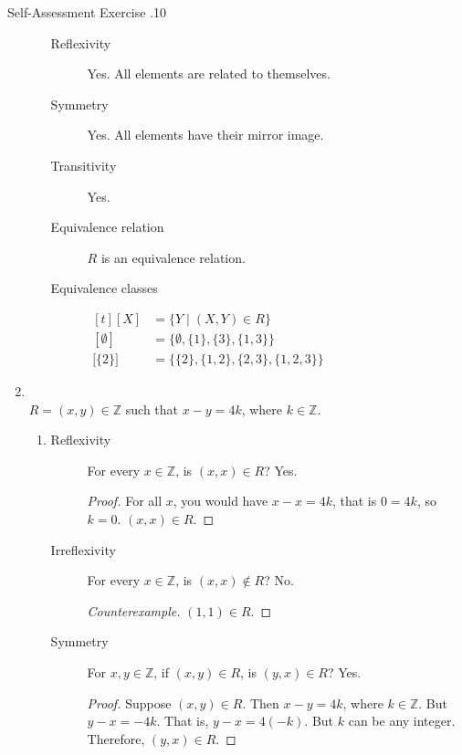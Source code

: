 \documentclass[../notes.tex]{subfiles}
\begin{document}
\begin{exercise}{Self-Assessment Exercise \thechapter.10}
\begin{enumerate}
\begin{enumerate}[label=(\alph*)]
\begin{description}
										\item[Reflexivity] Yes. All elements are related to themselves.
										\item[Symmetry] Yes. All elements have their mirror image.
										\item[Transitivity] Yes.
										\item[Equivalence relation] $R$ is an equivalence relation.
										\item[Equivalence classes] $
											\begin{aligned}[t]
												[X] &= \{Y \mid (X, Y) \in R\}\\
												[\emptyset] &= \bigl\{\emptyset, \{1\}, \{3\}, \{1, 3\}\bigr\}\\
												\bigl[\{2\}\bigr] &= \bigl\{\{2\}, \{1, 2\}, \{2, 3\}, \{1, 2, 3\}\bigr\}
											\end{aligned} $   
									\end{description}
							\end{enumerate}
						\item {}\\
							$R = (x, y) \in \mathbb{Z}$ such that $ x - y = 4k$, where $k \in \mathbb{Z}$.
							\begin{enumerate}[label=(\alph*)]
								\item {}
									\begin{description}
										\item[Reflexivity] For every $x \in \mathbb{Z}$, is $(x, x) \in R$? Yes.
											\begin{proof}
												For all $x$, you would have $x - x = 4k$, that is $0 = 4k$, so $k = 0$. $(x, x) \in R$.
											\end{proof}
										\item[Irreflexivity] For every $x \in \mathbb{Z}$, is $(x, x) \notin R$? No.
											\begin{proof}[Counterexample]
												$(1, 1) \in R$.
											\end{proof}
										\item[Symmetry] For $x, y \in \mathbb{Z}$, if $(x, y) \in R$, is $(y, x) \in R$? Yes.
											\begin{proof}
												Suppose $(x, y) \in R$. Then $x - y = 4k$, where $k \in \mathbb{Z}$. But $y - x = -4k$. That is, $y - x = 4(-k)$. But $k$ can be any integer. Therefore, $(y, x) \in R$.

\end{proof}
\end{description}
\end{enumerate}
\end{enumerate}
\end{exercise}
\end{document}
